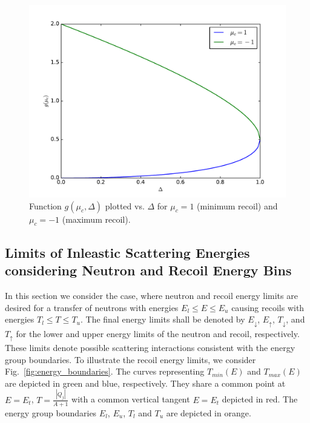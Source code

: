 \documentclass[review]{elsarticle}
\begin{document}
\begin{figure}
	\centering
	\includegraphics[width=0.75\linewidth]{g_mu_delta.pdf}
	\caption{Function $g(\mu_c, \Delta)$ plotted vs. $\Delta$ for $\mu_c=1$ (minimum recoil) and $\mu_c=-1$ (maximum recoil).}
	\label{fig:g_mu_delta}
\end{figure}

\subsection{Limits of Inleastic Scattering Energies considering Neutron and Recoil Energy Bins}
In this section we consider the case, where neutron and recoil energy limits are desired for a transfer of neutrons with energies $E_l \le E \le E_u$ causing recoils with energies $T_l \le T \le T_u$. The final energy limits shall be denoted by $E_{\downarrow}$, $E_{\uparrow}$, $T_{\downarrow}$, and $T_{\uparrow}$ for the lower and upper energy limits of the neutron and recoil, respectively. These limits denote possible scattering interactions consistent with the energy group boundaries. To illustrate the recoil energy limits, we consider Fig.~\ref{fig:energy_boundaries}. The curves representing $T_{min}(E)$ and $T_{max}(E)$ are depicted in green and blue, respectively. They share a common point at $E=E_t$, $T=\frac{|Q_j|}{A+1}$ with a common vertical tangent $E=E_t$ depicted in red. The energy group boundaries $E_l$, $E_u$, $T_l$ and $T_u$ are depicted in orange. 
\end{document}
